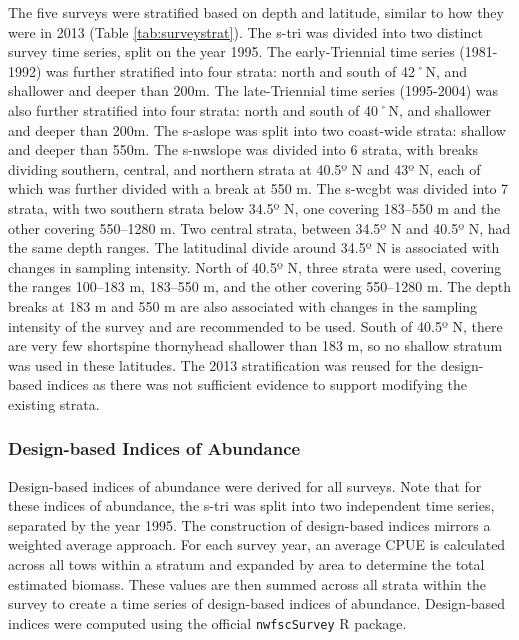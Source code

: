 \documentclass[11pt,
  english,
  letterpaper,
]{article}
\begin{document}
The five surveys were stratified based on depth and latitude, similar to how they were in 2013 (Table \ref{tab:surveystrat}). The \gls{s-tri} was divided into two distinct survey time series, split on the year 1995. The early-Triennial time series (1981-1992) was further stratified into four strata: north and south of 42˚N, and shallower and deeper than 200m. The late-Triennial time series (1995-2004) was also further stratified into four strata: north and south of 40˚N, and shallower and deeper than 200m. The \gls{s-aslope} was split into two coast-wide strata: shallow and deeper than 550m. The \gls{s-nwslope} was divided into 6 strata, with breaks dividing southern, central, and northern strata at 40.5º N and 43º N, each of which was further divided with a break at 550 m. The \gls{s-wcgbt} was divided into 7 strata, with two southern strata below 34.5º N, one covering 183--550 m and the other covering 550--1280 m. Two central strata, between 34.5º N and 40.5º N, had the same depth ranges. The latitudinal divide around 34.5º N is associated with changes in sampling intensity. North of 40.5º N, three strata were used, covering the ranges 100--183 m, 183--550 m, and the other covering 550--1280 m. The depth breaks at 183 m and 550 m are also associated with changes in the sampling intensity of the survey and are recommended to be used. South of 40.5º N, there are very few shortspine thornyhead shallower than 183 m, so no shallow stratum was used in these latitudes. The 2013 stratification was reused for the design-based indices as there was not sufficient evidence to support modifying the existing strata.

\hypertarget{design-based-indices-of-abundance}{%
\subsubsection{Design-based Indices of Abundance}\label{design-based-indices-of-abundance}}

Design-based indices of abundance were derived for all surveys. Note that for these indices of abundance, the \gls{s-tri} was split into two independent time series, separated by the year 1995. The construction of design-based indices mirrors a weighted average approach. For each survey year, an average CPUE is calculated across all tows within a stratum and expanded by area to determine the total estimated biomass. These values are then summed across all strata within the survey to create a time series of design-based indices of abundance. Design-based indices were computed using the official \texttt{nwfscSurvey} R package.
\end{document}
